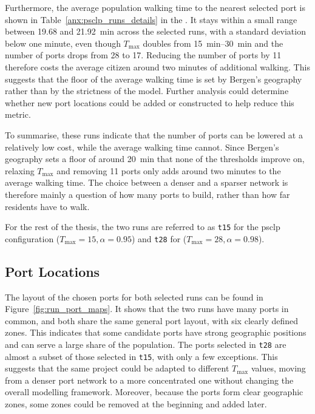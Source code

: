\documentclass[12pt]{article}
\begin{document}
Furthermore, the average population walking time to the nearest selected port is shown in Table~\ref{anx:psclp_runs_details} in the . It stays within a small range between 19.68 and \qty{21.92}{\minute} across the selected runs, with a standard deviation below one minute, even though \(T_{\max}\) doubles from \qtyrange{15}{30}{\minute} and the number of ports drops from 28 to 17. Reducing the number of ports by \num{11} therefore costs the average citizen around two minutes of additional walking. This suggests that the floor of the average walking time is set by Bergen's geography rather than by the strictness of the model. Further analysis could determine whether new port locations could be added or constructed to help reduce this metric.

To summarise, these runs indicate that the number of ports can be lowered at a relatively low cost, while the average walking time cannot. Since Bergen's geography sets a floor of around \qty{20}{\minute} that none of the thresholds improve on, relaxing \(T_{\max}\) and removing \num{11} ports only adds around two minutes to the average walking time. The choice between a denser and a sparser network is therefore mainly a question of how many ports to build, rather than how far residents have to walk.

For the rest of the thesis, the two runs are referred to as \texttt{t15} for the \ac{psclp} configuration (\(T_{\max}=15,\alpha=0.95\)) and \texttt{t28} for (\(T_{\max}=28,\alpha=0.98\)).

\subsection{Port Locations}
\label{subsec:port-locations}

The layout of the chosen ports for both selected runs can be found in Figure~\ref{fig:run_port_maps}. It shows that the two runs have many ports in common, and both share the same general port layout, with six clearly defined zones. This indicates that some candidate ports have strong geographic positions and can serve a large share of the population. The ports selected in \texttt{t28} are almost a subset of those selected in \texttt{t15}, with only a few exceptions. This suggests that the same project could be adapted to different \(T_{\max}\) values, moving from a denser port network to a more concentrated one without changing the overall modelling framework. Moreover, because the ports form clear geographic zones, some zones could be removed at the beginning and added later.
\end{document}
